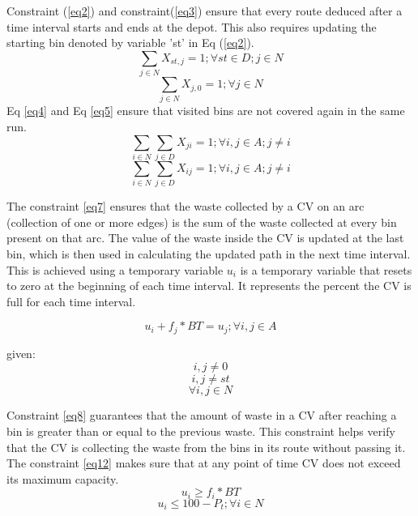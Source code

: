 \documentclass[12pt]{article}
\begin{document}
Constraint (\ref{eq2}) and constraint(\ref{eq3}) ensure that every route deduced after a time interval starts and ends at the depot. This also requires updating the starting bin denoted by variable 'st' in Eq (\ref{eq2}).
\begin{equation}\label{eq2}
    \sum_{j\in N}X_{st,j}=1 ; \forall st \in D ; j \in N
\end{equation}
\begin{equation}\label{eq3}
    \sum_{j\in N}X_{j,0}=1 ; \forall j \in N
\end{equation}
Eq \eqref{eq4} and Eq \eqref{eq5} ensure that visited bins are not covered again in the same run.
\begin{equation}\label{eq4}
    \sum_{i\in N}\sum_{j\in D } X_{ji}=1 ; \forall i,j \in A ; j\ne i
\end{equation}
\begin{equation}\label{eq5}
    \sum_{i\in N}\sum_{j\in D } X_{ij}=1 ; \forall i,j \in A ; j\ne i
\end{equation}

The constraint \eqref{eq7} ensures that the waste collected by a CV on an arc (collection of one or more edges) is the sum of the waste collected at every bin present on that arc. The value of the waste inside the CV is updated at the last bin, which is then used in calculating the updated path in the next time interval. This is achieved using a temporary variable $u_i$ is a temporary variable that resets to zero at the beginning of each time interval. It represents the percent the CV is full for each time interval. 

\begin{equation}\label{eq7}
    u_i+f_j*BT =u_j ; \forall i,j \in A 
\end{equation}

given: 
$$ i,j\ne 0$$
$$ i,j \ne st $$
$$  \forall i,j\in N$$

Constraint \eqref{eq8} guarantees that the amount of waste in a CV after reaching a bin is greater than or equal to the previous waste. This constraint helps verify that the CV is collecting the waste from the bins in its route without passing it.
The constraint \eqref{eq12} makes sure that at any point of time CV does not exceed its maximum capacity. 
\begin{equation}\label{eq8}
    u_i\ge f_i*BT
\end{equation}
\begin{equation}\label{eq12}
    u_i\le 100 - P_t ; \forall i \in N
\end{equation}
\end{document}
